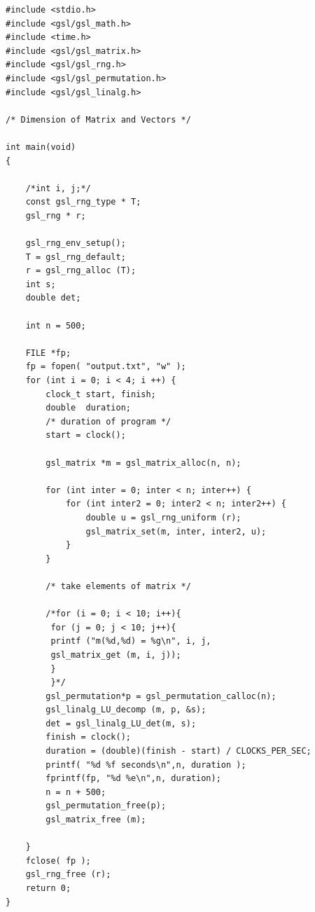 \documentclass{article}
\begin{document}
\begin{lstlisting}
#include <stdio.h>
#include <gsl/gsl_math.h>
#include <time.h>
#include <gsl/gsl_matrix.h>
#include <gsl/gsl_rng.h>
#include <gsl/gsl_permutation.h>
#include <gsl/gsl_linalg.h>

/* Dimension of Matrix and Vectors */

int main(void)
{
    
    /*int i, j;*/
    const gsl_rng_type * T;
    gsl_rng * r;
    
    gsl_rng_env_setup();
    T = gsl_rng_default;
    r = gsl_rng_alloc (T);
    int s;
    double det;
    
    int n = 500;
    
    FILE *fp;
    fp = fopen( "output.txt", "w" );
    for (int i = 0; i < 4; i ++) {
        clock_t start, finish;
        double  duration;
        /* duration of program */
        start = clock();
        
        gsl_matrix *m = gsl_matrix_alloc(n, n);
        
        for (int inter = 0; inter < n; inter++) {
            for (int inter2 = 0; inter2 < n; inter2++) {
                double u = gsl_rng_uniform (r);
                gsl_matrix_set(m, inter, inter2, u);
            }
        }
        
        /* take elements of matrix */
        
        /*for (i = 0; i < 10; i++){
         for (j = 0; j < 10; j++){
         printf ("m(%d,%d) = %g\n", i, j,
         gsl_matrix_get (m, i, j));
         }
         }*/
        gsl_permutation*p = gsl_permutation_calloc(n);
        gsl_linalg_LU_decomp (m, p, &s);
        det = gsl_linalg_LU_det(m, s);
        finish = clock();
        duration = (double)(finish - start) / CLOCKS_PER_SEC;
        printf( "%d %f seconds\n",n, duration );
        fprintf(fp, "%d %e\n",n, duration);
        n = n + 500;
        gsl_permutation_free(p);
        gsl_matrix_free (m);

    }
    fclose( fp );
    gsl_rng_free (r);
    return 0;
}
\end{lstlisting}
\end{document}
